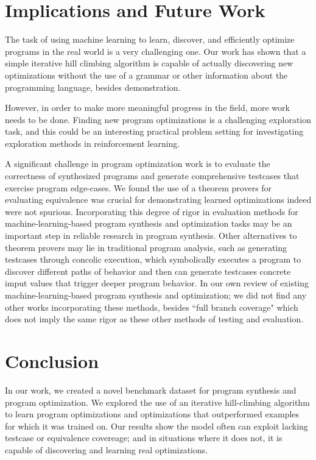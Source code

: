 \documentclass{article}
\begin{document}
\section{Implications and Future Work}

The task of using machine learning to learn, discover, and efficiently optimize programs in the real world is a very challenging one. Our work has shown that a simple iterative hill climbing algorithm is capable of actually discovering new optimizations without the use of a grammar or other information about the programming language, besides demonstration. 

However, in order to make more meaningful progress in the field, more work needs to be done. Finding new program optimizations is a challenging exploration task, and this could be an interesting practical problem setting for investigating exploration methods in reinforcement learning. 

A significant challenge in program optimization work is to evaluate the correctness of synthesized programs and generate comprehensive testcases that exercise program edge-cases. We found the use of a theorem provers for evaluating equivalence was crucial for demonstrating learned optimizations indeed were not spurious. Incorporating this degree of rigor in evaluation methods for machine-learning-based program synthesis and optimization tasks may be an important step in reliable research in program synthesis. Other alternatives to theorem provers may lie in traditional program analysis, such as generating testcases through concolic execution, which symbolically executes a program to discover different paths of behavior and then can generate testcases concrete imput values that trigger deeper program behavior. In our own review of existing machine-learning-based program synthesis and optimization; we did not find any other works incorporating these methods, besides ``full branch coverage" which does not imply the same rigor as these other methods of testing and evaluation. 


\section{Conclusion}

In our work, we created a novel benchmark dataset for program synthesis and program optimization. We explored the use of an iterative hill-climbing algorithm to learn program optimizations and optimizations that outperformed examples for which it was trained on. Our results show the model often can exploit lacking testcase or equivalence covereage; and in situations where it does not, it is capable of discovering and learning real optimizations. 




\end{document}
